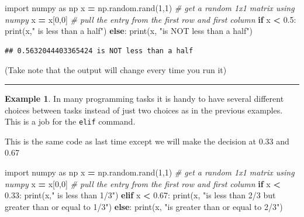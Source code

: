 \documentclass[
]{book}
\newenvironment{Shaded}{\begin{snugshade}}{\end{snugshade}}
\newcommand{\BuiltInTok}[1]{#1}
\newcommand{\CommentTok}[1]{\textcolor[rgb]{0.56,0.35,0.01}{\textit{#1}}}
\newcommand{\ControlFlowTok}[1]{\textcolor[rgb]{0.13,0.29,0.53}{\textbf{#1}}}
\newcommand{\DecValTok}[1]{\textcolor[rgb]{0.00,0.00,0.81}{#1}}
\newcommand{\FloatTok}[1]{\textcolor[rgb]{0.00,0.00,0.81}{#1}}
\newcommand{\ImportTok}[1]{#1}
\newcommand{\NormalTok}[1]{#1}
\newcommand{\OperatorTok}[1]{\textcolor[rgb]{0.81,0.36,0.00}{\textbf{#1}}}
\newcommand{\StringTok}[1]{\textcolor[rgb]{0.31,0.60,0.02}{#1}}
\theoremstyle{definition}
\theoremstyle{definition}
\newtheorem{example}{Example}[chapter]
\theoremstyle{definition}
\theoremstyle{remark}
\begin{document}
\begin{Shaded}
\begin{Highlighting}[]
\ImportTok{import}\NormalTok{ numpy }\ImportTok{as}\NormalTok{ np}
\NormalTok{x }\OperatorTok{=}\NormalTok{ np.random.rand(}\DecValTok{1}\NormalTok{,}\DecValTok{1}\NormalTok{) }\CommentTok{\# get a random 1x1 matrix using numpy}
\NormalTok{x }\OperatorTok{=}\NormalTok{ x[}\DecValTok{0}\NormalTok{,}\DecValTok{0}\NormalTok{] }\CommentTok{\# pull the entry from the first row and first column}
\ControlFlowTok{if}\NormalTok{ x }\OperatorTok{\textless{}} \FloatTok{0.5}\NormalTok{:}
    \BuiltInTok{print}\NormalTok{(x,}\StringTok{" is less than a half"}\NormalTok{)}
\ControlFlowTok{else}\NormalTok{:}
    \BuiltInTok{print}\NormalTok{(x, }\StringTok{"is NOT less than a half"}\NormalTok{)}
\end{Highlighting}
\end{Shaded}

\begin{verbatim}
## 0.5632044403365424 is NOT less than a half
\end{verbatim}

(Take note that the output will change every time you run it)

\begin{center}\rule{0.5\linewidth}{0.5pt}\end{center}

\begin{example}
\protect\hypertarget{exm:unnamed-chunk-677}{}{\label{exm:unnamed-chunk-677} }In many programming tasks it is handy to have several different choices
between tasks instead of just two choices as in the previous examples.
This is a job for the \texttt{elif} command.

This is the same code as last time except we will make the decision at
0.33 and 0.67
\end{example}

\begin{Shaded}
\begin{Highlighting}[]
\ImportTok{import}\NormalTok{ numpy }\ImportTok{as}\NormalTok{ np}
\NormalTok{x }\OperatorTok{=}\NormalTok{ np.random.rand(}\DecValTok{1}\NormalTok{,}\DecValTok{1}\NormalTok{) }\CommentTok{\# get a random 1x1 matrix using numpy}
\NormalTok{x }\OperatorTok{=}\NormalTok{ x[}\DecValTok{0}\NormalTok{,}\DecValTok{0}\NormalTok{] }\CommentTok{\# pull the entry from the first row and first column}
\ControlFlowTok{if}\NormalTok{ x }\OperatorTok{\textless{}} \FloatTok{0.33}\NormalTok{:}
    \BuiltInTok{print}\NormalTok{(x,}\StringTok{" is less than 1/3"}\NormalTok{)}
\ControlFlowTok{elif}\NormalTok{ x }\OperatorTok{\textless{}} \FloatTok{0.67}\NormalTok{:}
    \BuiltInTok{print}\NormalTok{(x, }\StringTok{"is less than 2/3 but greater than or equal to 1/3"}\NormalTok{)}
\ControlFlowTok{else}\NormalTok{:}
    \BuiltInTok{print}\NormalTok{(x, }\StringTok{"is greater than or equal to 2/3"}\NormalTok{)}
\end{Highlighting}
\end{Shaded}
\end{document}
